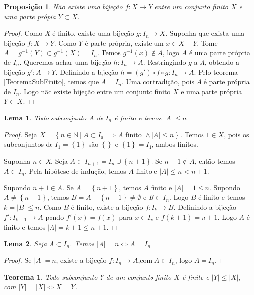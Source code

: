 \documentclass{article}
\newtheorem{prop}{Proposição}[section]
\theoremstyle{theorem}
\newtheorem{teo}{Teorema}
\theoremstyle{lemma}
\newtheorem{lema}{Lema}
\theoremstyle{definition}
\theoremstyle{remark}
\begin{document}
\begin{prop}
	Não existe uma bijeção $f:X\to Y$ entre um conjunto finito $X$ e uma parte própia $Y \subset X$.
\end{prop}
\begin{proof}
	\label{propPartePropria}
	Como $X$ é finito, existe uma bijeção $g: I_n \to X$. Suponha que exista uma bijeção $f:X\to Y$. Como $Y$ é parte própria, existe um $x\in X -Y$. Tome $A = g^{-1}(Y)\subset g^{-1}(X) = I_n$. Temos $g^{-1}(x) \not \in A$, logo $A$ é uma parte própria de $I_n$. Queremos achar uma bijeção $h: I_n \to A$. Restringindo $g$ a $A$, obtendo a bijeção $g':A\to Y$. Definindo a bijeção $h = (g') \circ f \circ g : I_n \to A$. Pelo teorema \ref{TeoremaSubFinito}, temos que $A = I_n$. Uma contradição, pois $A$ é parte própria de $I_n$. Logo não existe bijeção entre um conjunto finito $X$ e uma parte própria $Y\subset X$.
\end{proof}
\begin{lema}
	Todo subconjunto $A$ de $I_n$ é finito e temos $|A| \leq n$ 
\end{lema}
\begin{proof}
	Seja $X = \left\{ n\in \mathbb{N} \: | \:  A \subset I_n \implies A \text{ finito } \land |A| \leq n \right\}$. Temos $1 \in X$, pois os subconjuntos de $I_1 = \left\{1\right\}$ são $\left\{\right\} $ e $\left\{1\right\} = I_1$, ambos finitos. 

	Suponha $n \in X$.  Seja $A \subset I_{n+1} = I_n\cup \left\{n+1\right\}$.  Se $n+1\not \in A$, então temos $A \subset I_n$. Pela hipótese de indução, temos $A$ finito e $|A| \leq n < n+1$. 

	Supondo $n+1\in A$. Se $A = \left\{n+1\right\}$, temos $A$ finito e $|A| = 1 \leq n$.  Supondo $A \neq \left\{n+1\right\}$, temos $B = A-\left\{n+1\right\} \neq \emptyset$ e $B\subset I_n$. Logo $B$ é finito e temos $ k = |B| \leq n$. Como $B$ é finito, existe a bijeção $f: I_k \to B$. Definindo a bijeção $f': I_{k+1} \to A$ pondo $f'(x) = f(x)$ para $x\in I_n$ e $f(k+1) = n+1$.  Logo $A$ é finito e temos $|A| = k+1 \leq n+1$.


\end{proof}
\begin{lema}
	Seja $A\subset I_n$. Temos $|A| = n \iff A = I_n$.
\end{lema}
\begin{proof}
	Se $|A| = n$, existe a bijeção $f: I_n \to A$,com $A \subset I_n$, logo $A = I_n$.
\end{proof}
\begin{teo}
	Todo subconjunto $Y$ de um conjunto finito $X$ é finito e $|Y| \leq |X|$, com $|Y| = |X| \iff X = Y$.
\end{teo}
\end{document}
